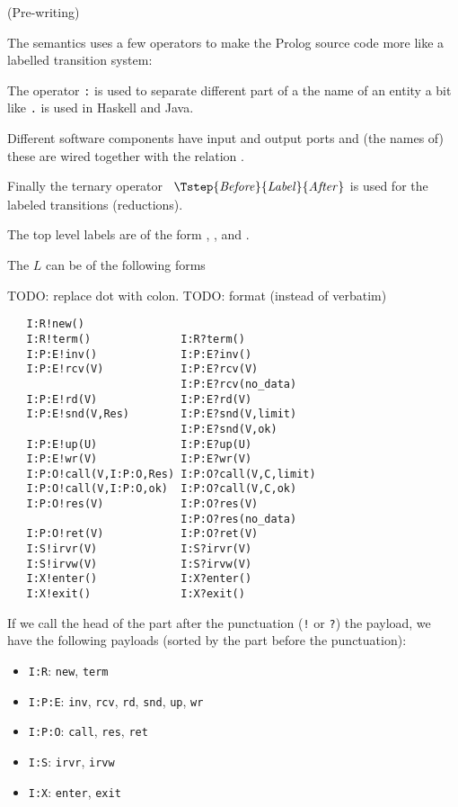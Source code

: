 (Pre-writing)

The semantics uses a few operators to make the Prolog source code more
like a labelled transition system:

The operator \verb+:+ is used to separate different part of a the name of
an entity a bit like \verb+.+ is used in Haskell and Java.

Different software components have input and output ports and (the
names of) these are wired together with the relation
\Tconnect{\cdot}{\cdot}.

Finally the ternary operator
\(\begin{array}{r@{}c@{}l}\Tstep{\mathit{Before}}{\mathit{Label}}{\mathit{After}}\end{array}\)
is used for the labeled transitions (reductions).

The top level labels are of the form , , and
.

The $L$ can be of the following forms

TODO: replace dot with colon.
TODO: format (instead of verbatim)

\begin{verbatim}
   I:R!new()
   I:R!term()              I:R?term()
   I:P:E!inv()             I:P:E?inv()
   I:P:E!rcv(V)            I:P:E?rcv(V)
                           I:P:E?rcv(no_data)
   I:P:E!rd(V)             I:P:E?rd(V)
   I:P:E!snd(V,Res)        I:P:E?snd(V,limit)
                           I:P:E?snd(V,ok)
   I:P:E!up(U)             I:P:E?up(U)
   I:P:E!wr(V)             I:P:E?wr(V)
   I:P:O!call(V,I:P:O,Res) I:P:O?call(V,C,limit)
   I:P:O!call(V,I:P:O,ok)  I:P:O?call(V,C,ok)
   I:P:O!res(V)            I:P:O?res(V)
                           I:P:O?res(no_data)
   I:P:O!ret(V)            I:P:O?ret(V)
   I:S!irvr(V)             I:S?irvr(V)
   I:S!irvw(V)             I:S?irvw(V)
   I:X!enter()             I:X?enter()
   I:X!exit()              I:X?exit()
\end{verbatim}

If we call the head of the part after the punctuation (\verb+!+ or
\verb+?+) the payload, we have the following payloads (sorted by the
part before the punctuation):

\begin{itemize}
\item \verb+I:R+:   \verb+new+, \verb+term+
\item \verb+I:P:E+: \verb+inv+, \verb+rcv+, \verb+rd+, \verb+snd+, \verb+up+, \verb+wr+
\item \verb+I:P:O+: \verb+call+, \verb+res+, \verb+ret+
\item \verb+I:S+:   \verb+irvr+, \verb+irvw+
\item \verb+I:X+:   \verb+enter+, \verb+exit+
\end{itemize}

